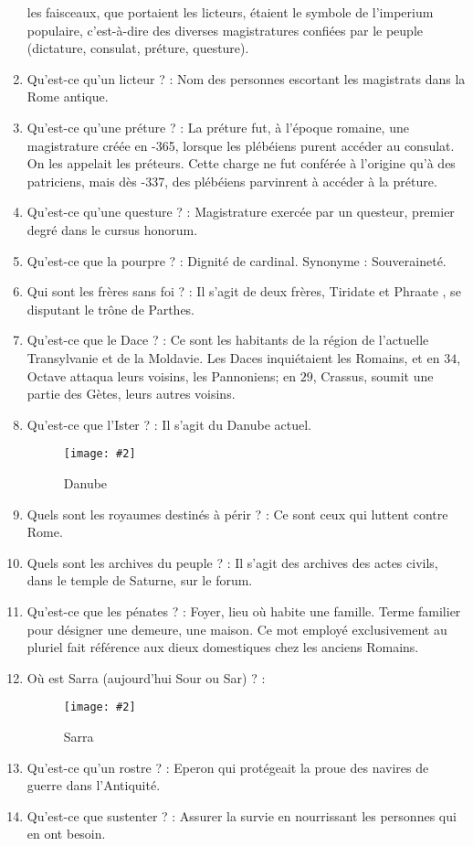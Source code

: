\documentclass[a4paper, 11pt, hidelinks]{article}
\newcommand{\img}[4]{\begin{figure}[!ht]
    \centering
    \texttt{[image: \#2]}
    \caption{#3}
    \label{#4}
    \end{figure} }
\begin{document}
\begin{enumerate}
            les faisceaux, que portaient les licteurs, étaient le symbole de l'imperium populaire, c'est-à-dire des diverses magistratures
            confiées par le peuple (dictature, consulat, préture, questure).
      \item Qu'est-ce qu'un licteur ? : Nom des personnes escortant les magistrats dans la Rome antique.
      \item Qu'est-ce qu'une préture ? : La préture fut, à l'époque romaine, une magistrature créée en -365, lorsque les plébéiens purent accéder au consulat. On les appelait les préteurs. Cette charge ne fut conférée à
            l'origine qu'à des patriciens, mais dès -337, des plébéiens parvinrent à accéder à la préture.
      \item Qu'est-ce qu'une questure ? : Magistrature exercée par un questeur, premier degré dans le cursus honorum.
      \item Qu'est-ce que la pourpre ? : Dignité de cardinal. Synonyme : Souveraineté.
      \item Qui sont les frères sans foi ? : Il s'agit de deux frères, Tiridate et Phraate , se disputant le trône de Parthes.
      \item Qu'est-ce que le Dace ? : Ce sont les habitants de la région de l'actuelle Transylvanie et de la Moldavie. Les Daces
            inquiétaient les Romains, et en $34$, Octave attaqua leurs voisins, les Pannoniens; en $29$, Crassus, soumit une partie
            des Gètes, leurs autres voisins.
      \item Qu'est-ce que l'Ister ? : Il s'agit du Danube actuel.
            \img{0.3}{Danube.jpg}{Danube}{105}
      \item Quels sont les royaumes destinés à périr ? : Ce sont ceux qui luttent contre Rome.
      \item Quels sont les archives du peuple ? : Il s'agit des archives des actes civils, dans le temple de Saturne, sur le forum.
      \item Qu'est-ce que les pénates ? : Foyer, lieu où habite une famille. Terme familier pour désigner une demeure, une maison. Ce mot employé exclusivement au pluriel fait référence
            aux dieux domestiques chez les anciens Romains.
      \item Où est Sarra (aujourd'hui Sour ou Sar) ? :
            \img{0.45}{Sarra.png}{Sarra}{106}
      \item Qu'est-ce qu'un rostre ? : Eperon qui protégeait la proue des navires de guerre dans l'Antiquité.
      \item Qu'est-ce que sustenter ? : Assurer la survie en nourrissant les personnes qui en ont besoin.

\end{enumerate}
\end{document}
